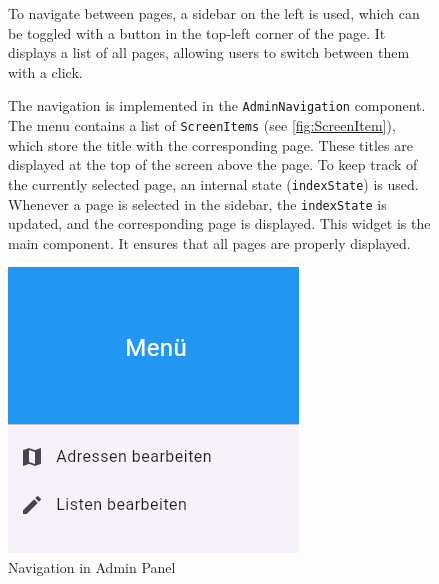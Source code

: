 \begin{figure}[H]

\begin{minipage}{0.58\textwidth}
    To navigate between pages, a sidebar on the left is used, which can be toggled with a button in the top-left corner of the page. It displays a list of all pages, allowing users to switch between them with a click.

    The navigation is implemented in the \texttt{AdminNavigation} component. The menu contains a list of \texttt{ScreenItems} (see \ref{fig:ScreenItem}), which store the title with the corresponding page. These titles are displayed at the top of the screen above the page. To keep track of the currently selected page, an internal state (\texttt{indexState}) is used. Whenever a page is selected in the sidebar, the \texttt{indexState} is updated, and the corresponding page is displayed. This widget is the main component. It ensures that all pages are properly displayed.

    \end{minipage}
    \hfill
    \begin{minipage}{0.38\textwidth}
    \centering
    \includegraphics[width=\linewidth]{images/AdminPanel/Menu.png}
    \caption{Navigation in Admin Panel}
    \label{fig:adminpanel_navigation}
\end{minipage}

\end{figure}



